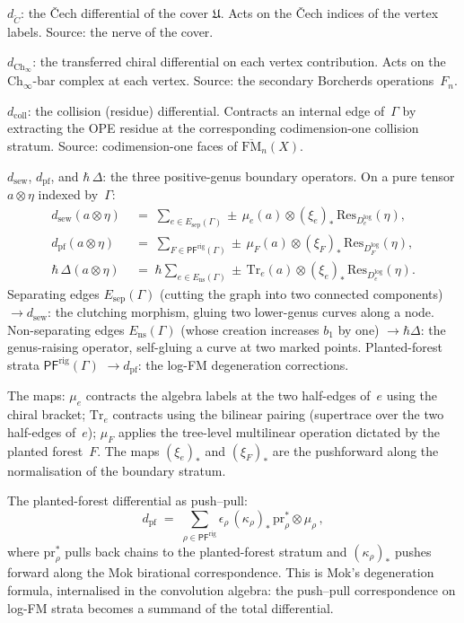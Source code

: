 \documentclass[11pt]{report}
\theoremstyle{definition}
\theoremstyle{remark}
\numberwithin{equation}{section}
\begin{document}
$d_{\check C}$: the \v{C}ech differential of the cover
$\mathfrak U$. Acts on the \v{C}ech indices of the vertex labels.
Source: the nerve of the cover.

$d_{\mathrm{Ch}_\infty}$: the transferred chiral differential
on each vertex contribution. Acts on the
$\mathrm{Ch}_\infty$-bar complex at each vertex. Source: the
secondary Borcherds operations~$F_n$.

$d_{\mathrm{coll}}$: the collision (residue) differential.
Contracts an internal edge of~$\Gamma$ by extracting the OPE
residue at the corresponding codimension-one collision stratum.
Source: codimension-one faces of $\overline{\mathrm{FM}}_n(X)$.

$d_{\mathrm{sew}}$, $d_{\mathrm{pf}}$, and $\hbar\,\Delta$: the three
positive-genus boundary operators. On a pure tensor $a\otimes\eta$
indexed by~$\Gamma$:
\begin{align*}
d_{\mathrm{sew}}(a\otimes\eta)
&\;=\;
\sum_{e\in E_{\mathrm{sep}}(\Gamma)}
\pm\,\mu_e(a)\otimes(\xi_e)_*\,
\mathrm{Res}_{D_e^{\log}}(\eta),
\\[4pt]
d_{\mathrm{pf}}(a\otimes\eta)
&\;=\;
\sum_{F\in\mathsf{PF}^{\mathrm{rig}}(\Gamma)}
\pm\,\mu_F(a)\otimes(\xi_F)_*\,
\mathrm{Res}_{D_F^{\log}}(\eta),
\\[4pt]
\hbar\,\Delta(a\otimes\eta)
&\;=\;
\hbar\sum_{e\in E_{\mathrm{ns}}(\Gamma)}
\pm\,\mathrm{Tr}_e(a)\otimes(\xi_e)_*\,
\mathrm{Res}_{D_e^{\log}}(\eta).
\end{align*}
Separating edges $E_{\mathrm{sep}}(\Gamma)$ (cutting the graph
into two connected components)
$\to d_{\mathrm{sew}}$: the clutching morphism, gluing two
lower-genus curves along a node.
Non-separating edges $E_{\mathrm{ns}}(\Gamma)$ (whose creation
increases $b_1$ by one) $\to\hbar\Delta$: the genus-raising operator,
self-gluing a curve at two marked points. Planted-forest strata
$\mathsf{PF}^{\mathrm{rig}}(\Gamma)$ $\to d_{\mathrm{pf}}$:
the log-FM degeneration corrections.

The maps: $\mu_e$ contracts the algebra labels at the two half-edges
of~$e$ using the chiral bracket; $\mathrm{Tr}_e$ contracts using the
bilinear pairing (supertrace over the two half-edges of~$e$);
$\mu_F$ applies the tree-level multilinear operation dictated by the
planted forest~$F$. The maps $(\xi_e)_*$ and $(\xi_F)_*$ are the
pushforward along the normalisation of the boundary stratum.

The planted-forest differential as push--pull:
\[
d_{\mathrm{pf}}
\;=\;
\sum_{\rho\in\mathsf{PF}^{\mathrm{rig}}}
\epsilon_\rho\,
(\kappa_\rho)_*\,\mathrm{pr}_\rho^*\otimes\mu_\rho\,,
\]
where $\mathrm{pr}_\rho^*$ pulls back chains to the planted-forest
stratum and $(\kappa_\rho)_*$ pushes forward along the Mok
birational correspondence. This is Mok's degeneration formula,
internalised in the convolution algebra: the push--pull
correspondence on log-FM strata becomes a summand of the total
differential.
\end{document}
